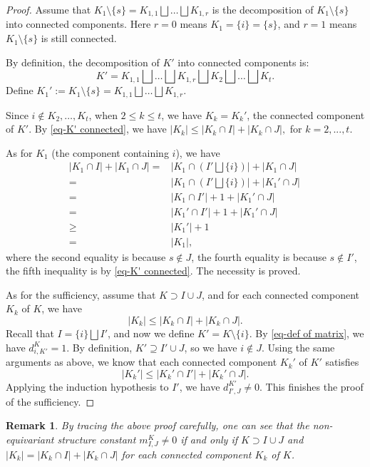 \documentclass[11pt, letterpaper]{amsart}
\numberwithin{equation}{section}
\newtheorem{remark}[theorem]{Remark}
\begin{document}
\begin{proof}
    Assume that \( K_1 \setminus \{s\} = K_{1,1} \bigsqcup \dots \bigsqcup K_{1,r} \) is the decomposition of \( K_1 \setminus \{s\} \) into connected components. Here \( r = 0 \) means \( K_1 = \{i\}=\{s\} \), and \( r = 1 \) means \( K_1 \setminus \{s\} \) is still connected.  

    By definition, the decomposition of \( K' \) into connected components is:  
\[ 
K' = K_{1,1} \bigsqcup \dots \bigsqcup K_{1,r} \bigsqcup K_2 \bigsqcup \dots \bigsqcup K_t. 
\]  
    Define \(K_1':=K_1\setminus\{s\}= K_{1,1} \bigsqcup \dots \bigsqcup K_{1,r}.\)

    Since \( i \notin K_2, \dots, K_t \), when \( 2 \leq k \leq t \), we have \( K_k = K_k' \), the connected component of \( K' \). By \eqref{eq-K' connected}, we have \( |K_k| \le |K_k \cap I| + |K_k \cap J|, \) for $k=2, ..., t$.
 
    As for \( K_1 \) (the component containing \( i \)), we have
\begin{align*}
|K_1 \cap I| + |K_1 \cap J|=&|K_1 \cap (I' \bigsqcup \{i\})| + |K_1 \cap J| \\
=&|K_1 \cap (I' \bigsqcup \{i\})| + |K_1' \cap J| \, \\
=&|K_1 \cap I'| + 1 + |K_1' \cap J| \\
=&|K_1' \cap I'| + 1 + |K_1' \cap J| \\
\ge&|K_1'|+1\\
=&|K_1|,
\end{align*}
where the second equality is because $s\notin J$, the fourth equality is because $s\notin I'$, the fifth inequality is by \eqref{eq-K' connected}. The necessity is proved.

    As for the sufficiency, assume that \( K \supset I \cup J \), and for each connected component \( K_k \) of \( K \), we have   
\[ 
|K_k| \le |K_k \cap I| + |K_k \cap J|. 
\]  
Recall that \( I = \{i\} \bigsqcup I' \), and now we define \( K' = K \setminus \{i\} \). By \eqref{eq-def of matrix}, we have \(d_{i,K'}^K = 1 \).
    By definition, \( K' \supseteq I' \cup J \), so we have $i\notin J$. Using the same arguments as above, we know that each connected component \( K_k' \) of \( K' \) satisfies 
\[ 
|K_k'| \le |K_k' \cap I'| + |K_k' \cap J|. 
\]  
Applying the induction hypothesis to $I'$, we have \( d_{I',J}^{K'} \neq 0 .\) 
    This finishes the proof of the sufficiency. 
\end{proof}

\begin{remark} \label{rmk-nonzero}
By tracing the above proof carefully, one can see that the non-equivariant structure constant $m_{I,J}^K\neq 0$ if and only if $K \supset I \cup J $ and
$|K_k|=|K_k\cap I| + |K_k\cap J|$ for each connected component $K_k$ of $K$. 
\end{remark}
\end{document}
